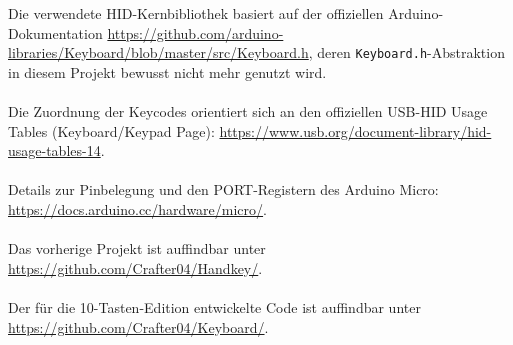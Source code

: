 \documentclass{article}
\begin{document}
\newpage
Die verwendete HID-Kernbibliothek basiert auf der offiziellen Arduino-Dokumentation
\url{https://github.com/arduino-libraries/Keyboard/blob/master/src/Keyboard.h}, deren \texttt{Keyboard.h}-Abstraktion in diesem Projekt bewusst nicht mehr genutzt wird.
\ \\
\ \\
Die Zuordnung der Keycodes orientiert sich an den offiziellen USB-HID Usage Tables (Keyboard/Keypad Page):
\url{https://www.usb.org/document-library/hid-usage-tables-14}.
\ \\
\ \\
Details zur Pinbelegung und den PORT-Registern des Arduino Micro:
\url{https://docs.arduino.cc/hardware/micro/}.
\ \\
\ \\
Das vorherige Projekt ist auffindbar unter
\url{https://github.com/Crafter04/Handkey/}.
\ \\
\ \\
Der für die 10-Tasten-Edition entwickelte Code ist auffindbar unter
\url{https://github.com/Crafter04/Keyboard/}.

\printglossary[type=main]
\printglossary[type=acronym]
\end{document}
